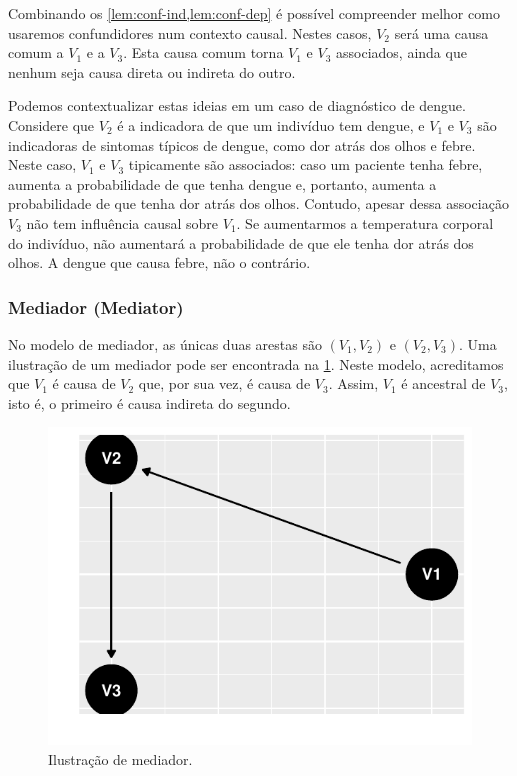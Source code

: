 Combinando os \cref{lem:conf-ind,lem:conf-dep} é 
possível compreender melhor como 
usaremos confundidores num contexto causal.
Nestes casos, $V_2$ será uma causa comum a $V_1$ e a $V_3$.
Esta causa comum torna $V_1$ e $V_3$ associados,
ainda que nenhum seja causa direta ou indireta do outro.

Podemos contextualizar estas ideias
em um caso de diagnóstico de dengue.
Considere que 
$V_2$ é a indicadora de que um indivíduo tem dengue, e
$V_1$ e $V_3$ são indicadoras de sintomas típicos de dengue, como
dor atrás dos olhos e febre.
Neste caso, $V_1$ e $V_3$ tipicamente são associados:
caso um paciente tenha febre,
aumenta a probabilidade de que tenha dengue e, portanto,
aumenta a probabilidade de que tenha dor atrás dos olhos.
Contudo, apesar dessa associação 
$V_3$ não tem influência causal sobre $V_1$.
Se aumentarmos a temperatura corporal do indivíduo,
não aumentará a probabilidade de que ele tenha dor atrás dos olhos.
A dengue que causa febre, não o contrário.

\subsubsection{Mediador (Mediator)}

No modelo de mediador, 
as únicas duas arestas são 
$(V_1, V_2)$ e $(V_2, V_3)$.
Uma ilustração de um mediador
pode ser encontrada 
na \cref{fig:mediador}.
Neste modelo, acreditamos que 
$V_1$ é causa de $V_2$ que,
por sua vez, é causa de $V_3$.
Assim, $V_1$ é ancestral de $V_3$,
isto é, o primeiro é 
causa indireta do segundo.


\begin{knitrout}
\color{fgcolor}\begin{figure}[t]

{\centering \includegraphics[width=\maxwidth]{./figures/mediador-1} 

}

\caption[Ilustração de mediador]{Ilustração de mediador.}\label{fig:mediador}
\end{figure}

\end{knitrout}

